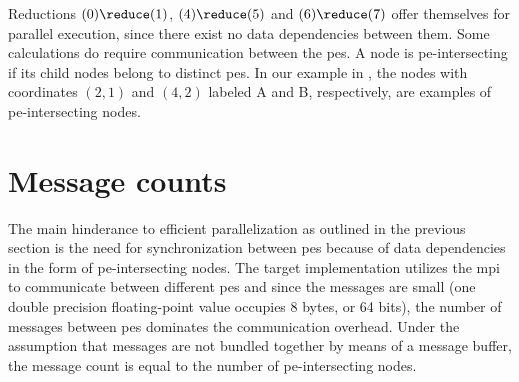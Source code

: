 Reductions $(0) \reduce (1)$, $(4) \reduce (5)$ and $(6) \reduce (7)$ offer themselves for parallel execution, since there exist no data dependencies between them.
Some calculations do require communication between the \glspl{pe}.
A node is \gls{pe}-intersecting if its child nodes belong to distinct \glspl{pe}.
In our example in , the nodes with coordinates $(2,1)$ and $(4,2)$ labeled A and B, respectively, are examples of \gls{pe}-intersecting nodes.

\section{Message counts}
The main hinderance to efficient parallelization as outlined in the previous section is the need for synchronization between \glspl{pe} because of data dependencies in the form of \gls{pe}-intersecting nodes.
The target implementation utilizes the \gls{mpi} to communicate between different \glspl{pe} and since the messages are small (one double precision floating-point value occupies 8 bytes, or 64 bits), the number of messages between \glspl{pe} dominates the communication overhead.
Under the assumption that messages are not bundled together by means of a message buffer, the message count is equal to the number of \gls{pe}-intersecting nodes.

